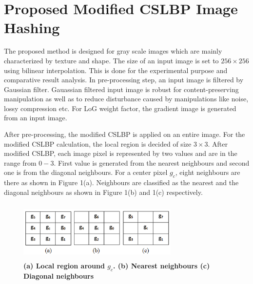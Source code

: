\documentclass[12pt,a4paper]{jihmsp}
\begin{document}
{{\section{Proposed Modified CSLBP Image Hashing}
The proposed method is designed for gray scale images which are mainly characterized by texture and shape. The size of an input image is set to $256\times256$ using bilinear interpolation. This is done for the experimental purpose and comparative result analysis.  In pre-processing step, an input image is filtered by Gaussian filter. Gauassian filtered input image is robust for content-preserving manipulation as well as to reduce disturbance caused by manipulations like noise, lossy compression etc. For LoG weight factor, the gradient image is generated from an input image.  
\par
After pre-processing, the modified CSLBP is applied on an entire image. For the modified CSLBP calculation, the local region is decided of size $3\times3$. After modified CSLBP, each image pixel is represented by two values and are in the range from $0 - 3$. First value is generated from the nearest neighbours and second one is from the diagonal neighbours. For a center pixel $g_c$, eight neighbours are there as shown in Figure 1(a). Neighbours are classified as the nearest and the diagonal neighbours as shown in Figure 1(b) and 1(c) respectively.\\

\begin{figure}[h]
\begin{center}
	\includegraphics[height=3cm, width=8cm]{figureR1}
	\caption{\textbf{(a) Local region around $g_{c}$. (b) Nearest neighbours (c) Diagonal neighbours}}
\end{center}
\end{figure}
	
}}
\end{document}

